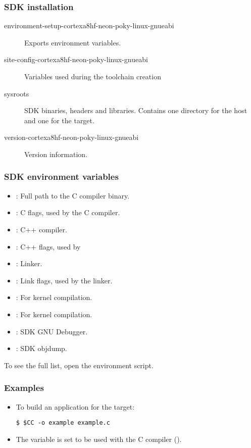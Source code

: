 \begin{frame}
  \frametitle{SDK installation}
  \begin{description}
    \item[environment-setup-cortexa8hf-neon-poky-linux-gnueabi] Exports environment
      variables.
    \item[site-config-cortexa8hf-neon-poky-linux-gnueabi] Variables used during the
      toolchain creation
    \item[sysroots] SDK binaries, headers and libraries. Contains
      one directory for the host and one for the target.
    \item[version-cortexa8hf-neon-poky-linux-gnueabi] Version information.
  \end{description}
\end{frame}

\begin{frame}
  \frametitle{SDK environment variables}
  \begin{itemize}
    \item {}: Full path to the C compiler binary.
    \item {}: C flags, used by the C compiler.
    \item {}: C++ compiler.
    \item {}: C++ flags, used by 
    \item {}: Linker.
    \item {}: Link flags, used by the linker.
    \item {}: For kernel compilation.
    \item {}: For kernel compilation.
    \item {}: SDK GNU Debugger.
    \item {}: SDK objdump.
  \end{itemize}
  To see the full list, open the environment script.
\end{frame}

\begin{frame}[fragile]
  \frametitle{Examples}
  \begin{itemize}
    \item To build an application for the target:
      \begin{block}{}
        \begin{verbatim}
$ $CC -o example example.c
        \end{verbatim}
      \end{block}
    \item The  variable is set to be used with the C
      compiler ().
  \end{itemize}
\end{frame}
